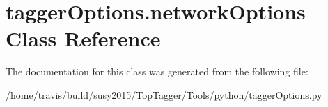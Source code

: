 \hypertarget{classtaggerOptions_1_1networkOptions}{\section{tagger\-Options.\-network\-Options Class Reference}
\label{classtaggerOptions_1_1networkOptions}
}


The documentation for this class was generated from the following file\-:\begin{DoxyCompactItemize}
\item 
/home/travis/build/susy2015/\-Top\-Tagger/\-Tools/python/tagger\-Options.\-py\end{DoxyCompactItemize}
